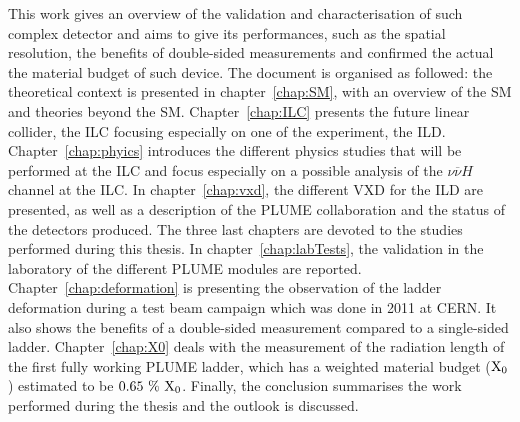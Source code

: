 
  This work gives an overview of the validation and characterisation of such complex detector and aims to give its performances, such as the spatial resolution, the benefits of double-sided measurements and confirmed the actual the material budget of such device.
  The document is organised as followed:
  the theoretical context is presented in chapter~\ref{chap:SM}, with an overview of the \gls{SM} and theories beyond the \gls{SM}.
  Chapter~\ref{chap:ILC} presents the future linear collider, the \gls{ILC} focusing especially on one of the experiment, the \gls{ILD}.
  Chapter~\ref{chap:phyics} introduces the different physics studies that will be performed at the \gls{ILC} and focus especially on a possible analysis of the $\nu\overline{\nu}H$ channel at the \gls{ILC}.
  In chapter~\ref{chap:vxd}, the different \gls{VXD} for the \gls{ILD} are presented, as well as a description of the \gls{PLUME} collaboration and the status of the detectors produced.
  The three last chapters are devoted to the studies performed during this thesis.
  In chapter~\ref{chap:labTests}, the validation in the laboratory of the different \gls{PLUME} modules are reported.
  Chapter~\ref{chap:deformation} is presenting the observation of the ladder deformation during a test beam campaign which was done in 2011 at \gls{CERN}. 
  It also shows the benefits of a double-sided measurement compared to a single-sided ladder.
  Chapter~\ref{chap:X0} deals with the measurement of the radiation length of the first fully working \gls{PLUME} ladder, which has a weighted material budget ($\rm{X_0}$) estimated to be $0.65~\%~\rm{X_0}$.
  Finally, the conclusion summarises the work performed during the thesis and the outlook is discussed.
